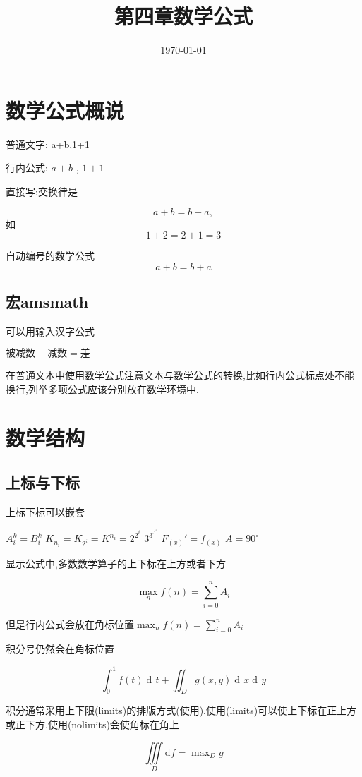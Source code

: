 \documentclass[UTF8]{ctexart}
\title{第四章数学公式}
\date{\today}
\DeclareMathOperator\dif{d\!}
\begin{document}
\maketitle
\section{数学公式概说}
普通文字: a+b,1+1

行内公式: $a+b$ , $1+1$

直接写:交换律是

\[ a+b = b+a, \]
如
\[
1+2=2+1=3
\]

自动编号的数学公式
\begin{equation}
a+b = b+a\label{eq:communtative}
\end{equation}

\subsection{宏amsmath}
可以用输入汉字公式

$\text{被减数} - \text{减数} = \text{差}$

在普通文本中使用数学公式注意文本与数学公式的转换,比如行内公式标点处不能换行,列举多项公式应该分别放在数学环境中.
\section{数学结构}
\subsection{上标与下标}
上标下标可以嵌套

$A_i^k = B^k_i$\qquad
$K_{n_i} = K_{2^i} = K^{n_i} = 2^{2^i}$\qquad
$3^{3^{\cdot^{\cdot^{\cdot^3}}}}$
$F_{(x)}' = f_{(x)}$
$ A = 90^\circ$

显示公式中,多数数学算子的上下标在上方或者下方

\[
  \max_n f(n) = \sum_{i=0}^n A_i
\]

但是行内公式会放在角标位置$\max_n f(n) = \sum_{i=0}^n A_i$

积分号仍然会在角标位置
\begin{codeshow}
  \[ \int_0^1 f(t) \dif t + \iint_D g(x,y) \dif x \dif y\]
\end{codeshow}

积分通常采用上下限(limits)的排版方式(使用),使用(limits)可以使上下标在正上方或正下方,使用(nolimits)会使角标在角上
\begin{codeshow}
  \[
    \iiint\limits_D \mathrm{d}f
     = \max \nolimits_D g
  \]
\end{codeshow}
\end{document}
